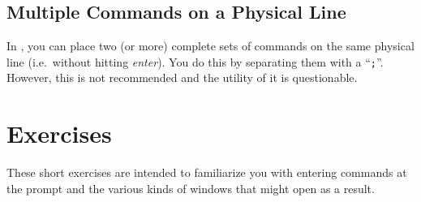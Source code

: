 \subsection{Multiple Commands on a Physical Line}
In \R{}, you can place two (or more) complete sets of commands on the
same physical line (i.e.\ without hitting \textit{enter}). You do this
by separating them with a ``\verb=;=''. However, this is not
recommended and the utility of it is questionable.


\section{Exercises}

These short exercises are intended to familiarize you with entering
commands at the prompt and the various kinds of windows that might
open as a result.

